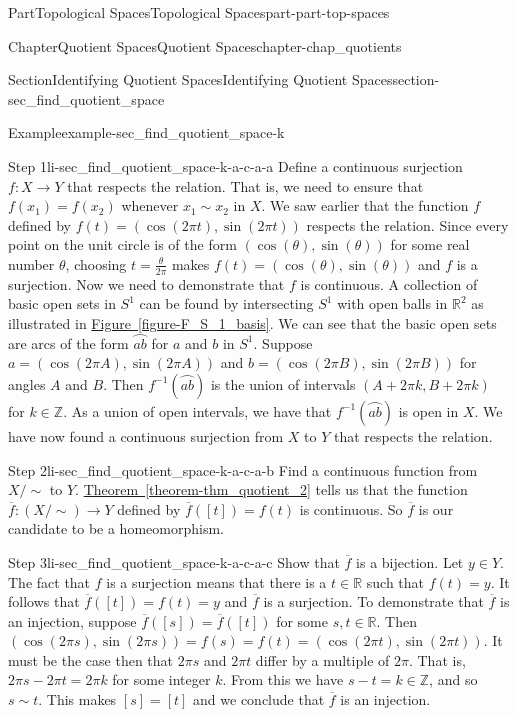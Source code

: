 \documentclass[oneside,10pt,]{book}
\newcommand{\xreffont}{\relax}
\numberwithin{equation}{chapter}
\newcommand{\Z}{\mathbb{Z}}
\newcommand{\R}{\mathbb{R}}
\newcommand{\ssim}{\sim}
\begin{document}
\begin{partptx}{Part}{Topological Spaces}{}{Topological Spaces}{}{}{part-part-top-spaces}
\begin{chapterptx}{Chapter}{Quotient Spaces}{}{Quotient Spaces}{}{}{chapter-chap_quotients}
\begin{sectionptx}{Section}{Identifying Quotient Spaces}{}{Identifying Quotient Spaces}{}{}{section-sec_find_quotient_space}
\begin{example}{Example}{}{example-sec_find_quotient_space-k}
\begin{descriptionlist}
\begin{dlimedium}{Step 1}{li-sec_find_quotient_space-k-a-c-a-a}
Define a continuous surjection \(f: X \to Y\) that respects the relation. That is, we need to ensure that \(f(x_1) = f(x_2)\) whenever \(x_1 \sim x_2\) in \(X\). We saw earlier that the function \(f\) defined by \(f(t) = (\cos(2 \pi t), \sin(2 \pi t))\) respects the relation. Since every point on the unit circle is of the form \((\cos(\theta), \sin(\theta))\) for some real number \(\theta\), choosing \(t = \frac{\theta}{2 \pi}\) makes \(f(t) = (\cos(\theta), \sin(\theta))\) and \(f\) is a surjection. Now we need to demonstrate that \(f\) is continuous. A collection of basic open sets in \(S^1\) can be found by intersecting \(S^1\) with open balls in \(\R^2\) as illustrated in \hyperref[figure-F_S_1_basis]{Figure~{\xreffont\ref{figure-F_S_1_basis}}}. We can see that the basic open sets are arcs of the form \(\overparen{ab}\) for \(a\) and \(b\) in \(S^1\). Suppose \(a = (\cos(2 \pi A), \sin(2 \pi A))\) and \(b = (\cos(2 \pi B), \sin(2 \pi B))\) for angles \(A\) and \(B\). Then \(f^{-1}(\overparen{ab})\) is the union of intervals \((A+2\pi k, B+2 \pi k)\) for \(k \in \Z\). As a union of open intervals, we have that \(f^{-1}(\overparen{ab})\) is open in \(X\). We have now found a continuous surjection from \(X\) to \(Y\) that respects the relation.%
\end{dlimedium}%
\begin{dlimedium}{Step 2}{li-sec_find_quotient_space-k-a-c-a-b}%
Find a continuous function from \(X/\ssim\) to \(Y\). \hyperref[theorem-thm_quotient_2]{Theorem~{\xreffont\ref{theorem-thm_quotient_2}}} tells us that the function \(\overline{f} : (X/\ssim) \to Y\) defined by \(\overline{f}([t]) = f(t)\) is continuous. So \(\overline{f}\) is our candidate to be a homeomorphism.%
\end{dlimedium}%
\begin{dlimedium}{Step 3}{li-sec_find_quotient_space-k-a-c-a-c}%
Show that \(\overline{f}\) is a bijection. Let \(y \in Y\). The fact that \(f\) is a surjection means that there is a \(t \in \R\) such that \(f(t) = y\). It follows that \(\overline{f}([t]) = f(t) = y\) and \(\overline{f}\) is a surjection. To demonstrate that \(\overline{f}\) is an injection, suppose \(\overline{f}([s]) = \overline{f}([t])\) for some \(s,
t \in \R\). Then \((\cos(2 \pi s), \sin(2 \pi s)) = f(s) = f(t) = (\cos(2\pi t), \sin(2 \pi t))\). It must be the case then that \(2 \pi s\) and \(2 \pi t\) differ by a multiple of \(2 \pi\). That is, \(2 \pi s - 2 \pi t = 2 \pi k\) for some integer \(k\). From this we have \(s - t = k \in \Z\), and so \(s \sim t\). This makes \([s] = [t]\) and we conclude that \(\overline{f}\) is an injection.%

\end{dlimedium}
\end{descriptionlist}
\end{example}
\end{sectionptx}
\end{chapterptx}
\end{partptx}
\end{document}
